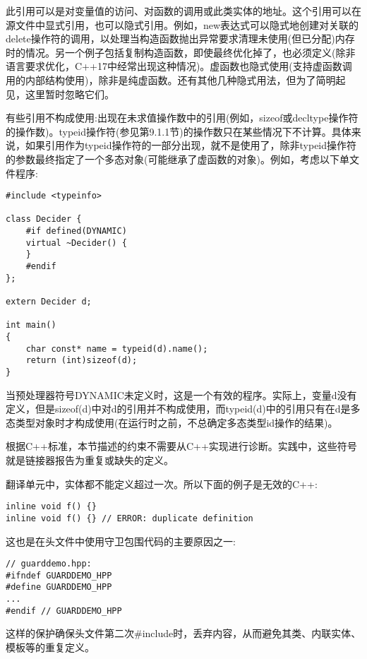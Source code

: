 此引用可以是对变量值的访问、对函数的调用或此类实体的地址。这个引用可以在源文件中显式引用，也可以隐式引用。例如，new表达式可以隐式地创建对关联的delete操作符的调用，以处理当构造函数抛出异常要求清理未使用(但已分配)内存时的情况。另一个例子包括复制构造函数，即使最终优化掉了，也必须定义(除非语言要求优化，C++17中经常出现这种情况)。虚函数也隐式使用(支持虚函数调用的内部结构使用)，除非是纯虚函数。还有其他几种隐式用法，但为了简明起见，这里暂时忽略它们。

有些引用不构成使用:出现在未求值操作数中的引用(例如，sizeof或decltype操作符的操作数)。typeid操作符(参见第9.1.1节)的操作数只在某些情况下不计算。具体来说，如果引用作为typeid操作符的一部分出现，就不是使用了，除非typeid操作符的参数最终指定了一个多态对象(可能继承了虚函数的对象)。例如，考虑以下单文件程序:

\begin{lstlisting}[style=styleCXX]
#include <typeinfo>

class Decider {
	#if defined(DYNAMIC)
	virtual ~Decider() {
	}
	#endif
};

extern Decider d;

int main()
{
	char const* name = typeid(d).name();
	return (int)sizeof(d);
}
\end{lstlisting}

当预处理器符号DYNAMIC未定义时，这是一个有效的程序。实际上，变量d没有定义，但是sizeof(d)中对d的引用并不构成使用，而typeid(d)中的引用只有在d是多态类型对象时才构成使用(在运行时之前，不总确定多态类型id操作的结果)。

根据C++标准，本节描述的约束不需要从C++实现进行诊断。实践中，这些符号就是链接器报告为重复或缺失的定义。


翻译单元中，实体都不能定义超过一次。所以下面的例子是无效的C++:

\begin{lstlisting}[style=styleCXX]
inline void f() {}
inline void f() {} // ERROR: duplicate definition
\end{lstlisting}

这也是在头文件中使用守卫包围代码的主要原因之一:

\begin{lstlisting}[style=styleCXX]
// guarddemo.hpp:
#ifndef GUARDDEMO_HPP
#define GUARDDEMO_HPP
...
#endif // GUARDDEMO_HPP
\end{lstlisting}

这样的保护确保头文件第二次\#include时，丢弃内容，从而避免其类、内联实体、模板等的重复定义。

